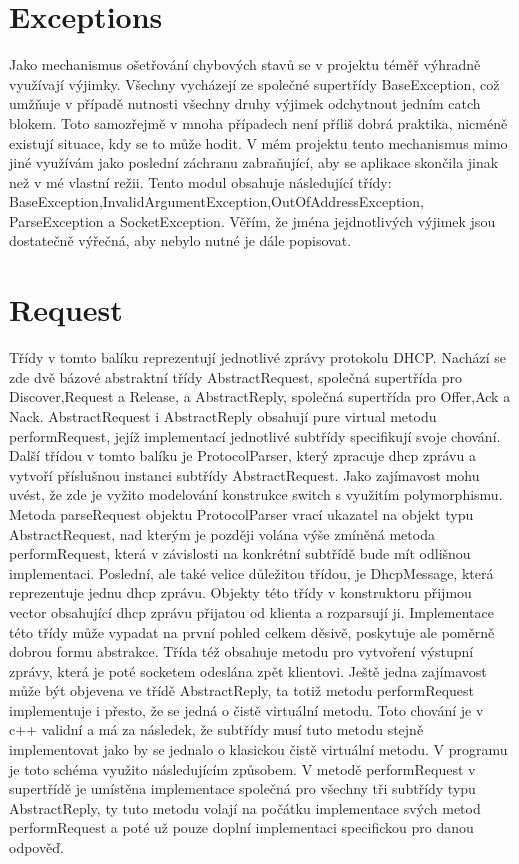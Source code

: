 \documentclass[12pt,a4paper]{report}
\begin{document}
\section*{Exceptions}
Jako mechanismus ošetřování chybových stavů se v projektu téměř výhradně využívají výjimky. Všechny vycházejí ze společné supertřídy BaseException, což umžňuje v případě nutnosti všechny druhy výjimek odchytnout jedním catch blokem. Toto samozřejmě v mnoha případech není příliš dobrá praktika, nicméně existují situace, kdy se to může hodit. V mém projektu tento mechanismus mimo jiné využívám jako poslední záchranu zabraňující, aby se aplikace skončila jinak než v mé vlastní režii. 
Tento modul obsahuje následující třídy: BaseException,InvalidArgumentException,OutOfAddressException,\\ParseException a SocketException.
Věřím, že jména jejdnotlivých výjimek jsou dostatečně výřečná, aby nebylo nutné je dále popisovat. 
\section*{Request}
Třídy v tomto balíku reprezentují jednotlivé zprávy protokolu DHCP. Nachází se zde dvě bázové abstraktní třídy AbstractRequest, společná supertřída pro Discover,Request a Release, a AbstractReply, společná supertřída pro Offer,Ack a Nack. AbstractRequest i AbstractReply obsahují pure virtual metodu performRequest, jejíž implementací jednotlivé subtřídy specifikují svoje chování. Další třídou v tomto balíku je ProtocolParser, který zpracuje dhcp zprávu a vytvoří příslušnou instanci subtřídy AbstractRequest. Jako zajímavost mohu uvést, že zde je vyžito modelování konstrukce switch s využitím polymorphismu. Metoda parseRequest objektu ProtocolParser vrací ukazatel na objekt typu AbstractRequest, nad kterým je později volána výše zmíněná metoda performRequest, která v závislosti na konkrétní subtřídě bude mít odlišnou implementaci. Poslední, ale také velice důležitou třídou, je DhcpMessage, která reprezentuje jednu dhcp zprávu. Objekty této třídy v konstruktoru přijmou vector obsahující dhcp zprávu přijatou od klienta a rozparsují ji. Implementace této třídy může vypadat na první pohled celkem děsivě, poskytuje ale poměrně dobrou formu abstrakce. Třída též obsahuje metodu pro vytvoření výstupní zprávy, která je poté socketem odeslána zpět klientovi. Ještě jedna zajímavost může být objevena ve třídě AbstractReply, ta totiž metodu performRequest implementuje i přesto, že se jedná o čistě virtuální metodu. Toto chování je v c++ validní a má za následek, že subtřídy musí tuto metodu stejně implementovat jako by se jednalo o klasickou čistě virtuální metodu. V programu je toto schéma využito následujícím způsobem. V metodě performRequest v supertřídě je umístěna implementace společná pro všechny tři subtřídy typu AbstractReply, ty tuto metodu volají na počátku implementace svých metod performRequest a poté už pouze doplní implementaci specifickou pro danou odpověď.
\end{document}
